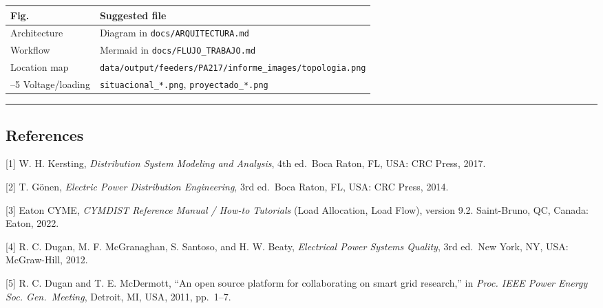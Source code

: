 \documentclass[
  11pt,
]{article}
\newcounter{none} %
\begin{document}
{\def\LTcaptype{none} %
\begin{longtable}[]{@{}
  >{\raggedright\arraybackslash}p{}
  >{\raggedright\arraybackslash}p{}@{}}
\toprule\noalign{}
\begin{minipage}[b]{\linewidth}\raggedright
Fig.
\end{minipage} & \begin{minipage}[b]{\linewidth}\raggedright
Suggested file
\end{minipage} \\
\midrule\noalign{}
\endhead
\bottomrule\noalign{}
\endlastfoot
1 Architecture & Diagram in \texttt{docs/ARQUITECTURA.md} \\
2 Workflow & Mermaid in \texttt{docs/FLUJO\_TRABAJO.md} \\
3 Location map &
\texttt{data/output/feeders/PA217/informe\_images/topologia.png} \\
4–5 Voltage/loading & \texttt{situacional\_*.png},
\texttt{proyectado\_*.png} \\
\end{longtable}
}

\begin{center}\rule{0.5\linewidth}{0.5pt}\end{center}

\subsection{References}\label{references}

{[}1{]} W. H. Kersting, \emph{Distribution System Modeling and
Analysis}, 4th ed.~Boca Raton, FL, USA: CRC Press, 2017.

{[}2{]} T. Gönen, \emph{Electric Power Distribution Engineering}, 3rd
ed.~Boca Raton, FL, USA: CRC Press, 2014.

{[}3{]} Eaton CYME, \emph{CYMDIST Reference Manual / How-to Tutorials}
(Load Allocation, Load Flow), version 9.2. Saint-Bruno, QC, Canada:
Eaton, 2022.

{[}4{]} R. C. Dugan, M. F. McGranaghan, S. Santoso, and H. W. Beaty,
\emph{Electrical Power Systems Quality}, 3rd ed.~New York, NY, USA:
McGraw-Hill, 2012.

{[}5{]} R. C. Dugan and T. E. McDermott, “An open source platform for
collaborating on smart grid research,” in \emph{Proc. IEEE Power Energy
Soc. Gen.~Meeting}, Detroit, MI, USA, 2011, pp.~1–7.
\end{document}
